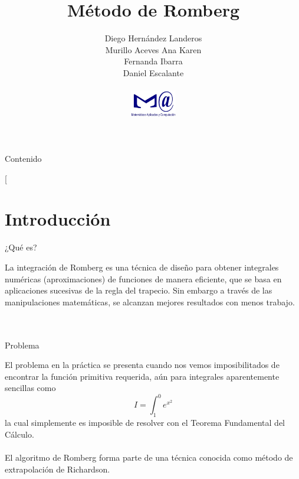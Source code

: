 \documentclass[spanish]{beamer}
\date{}
\makeatletter
\newcommand\makebeamertitle{\frame{\maketitle}}%
\let\origtableofcontents=\tableofcontents
\def\tableofcontents{\@ifnextchar[{\origtableofcontents}{\gobbletableofcontents}}
\def\gobbletableofcontents#1{\origtableofcontents}
\makeatother
\begin{document}
\title[Métodos numéricos II]{Método de Romberg}


\author[MAC]{
Diego Hernández Landeros\\
Murillo Aceves Ana Karen\\
Fernanda Ibarra\\
Daniel Escalante\\
\begin{figure}[h]
\centering
\includegraphics[width=2cm]{mac.png}
\end{figure}
}



\makebeamertitle

\begin{frame}[plain]{Contenido}


\tableofcontents{}
\end{frame}



\section{Introducción}
\begin{frame}{¿Qué es?}


La integración de Romberg es una \alert{técnica} de diseño para obtener integrales numéricas \alert{(aproximaciones)} de funciones de manera eficiente, que se basa en aplicaciones sucesivas de \alert{la regla del trapecio}. Sin embargo a través de las manipulaciones matemáticas, se alcanzan mejores resultados con menos trabajo.\\
\\$\,$\\ %

\end{frame}

\begin{frame}{Problema}

El problema en la práctica se presenta cuando nos vemos imposibilitados de encontrar la
función primitiva requerida, aún para integrales aparentemente sencillas como\\
{\small \[I=\int_{1}^{0}e^{x^{2}}\]}
la cual simplemente es imposible de resolver con el Teorema Fundamental del Cálculo.
\\$\,$\\
El algoritmo de Romberg forma parte de una técnica conocida como método de extrapolación de
Richardson.
\end{frame}
\end{document}
